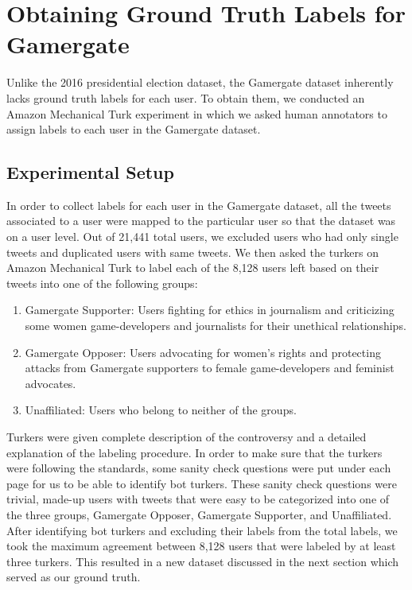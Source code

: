 \section{Obtaining Ground Truth Labels for Gamergate}
Unlike the 2016 presidential election dataset, the Gamergate dataset inherently lacks ground truth labels for each user. To obtain them, we conducted an Amazon Mechanical Turk experiment in which we asked human annotators to assign labels to each user in the Gamergate dataset.
\subsection{Experimental Setup}
In order to collect labels for each user in the Gamergate dataset, all the tweets associated to a user were mapped to the particular user so that the dataset was on a user level. Out of 21,441 total users, we excluded users who had only single tweets and duplicated users with same tweets. We then asked the turkers on Amazon Mechanical Turk to label each of the 8,128 users left based on their tweets into one of the following groups:
\begin{enumerate}
\item Gamergate Supporter: Users fighting for ethics in journalism and criticizing some women game-developers and journalists for their unethical relationships.
\item Gamergate Opposer:  Users advocating for women's rights and protecting attacks from Gamergate supporters to female game-developers and feminist advocates.
\item Unaffiliated: Users who belong to neither of the groups.
\end{enumerate}
Turkers were given complete description of the controversy and a detailed explanation of the labeling procedure. In order to make sure that the turkers were following the standards, some sanity check questions were put under each page for us to be able to identify bot turkers. These sanity check questions were trivial, made-up users with tweets that were easy to be categorized into one of the three groups, Gamergate Opposer, Gamergate Supporter, and Unaffiliated. After identifying bot turkers and excluding their labels from the total labels, we took the maximum agreement between 8,128 users that were labeled by at least three turkers. This resulted in a new dataset discussed in the next section which served as our ground truth.
